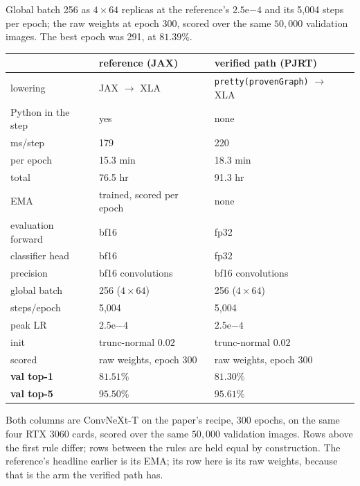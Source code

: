 \noindent Global batch 256 as $4 \times 64$ replicas at the reference's
$2.5\mathrm{e}{-4}$ and its 5{,}004 steps per epoch; the raw weights at
epoch 300, scored over the same $50{,}000$ validation images. The best
epoch was 291, at $81.39\%$.


\begin{center}
\begin{tabular}{@{}l l l@{}}
\hline
 & reference (JAX) & verified path (PJRT) \\
\hline
lowering             & JAX $\to$ XLA            & \texttt{pretty(provenGraph)} $\to$ XLA \\
Python in the step   & yes                      & none \\
ms/step              & 179                      & 220 \\
per epoch            & 15.3 min                 & 18.3 min \\
total                & 76.5 hr                  & 91.3 hr \\
EMA                  & trained, scored per epoch & none \\
evaluation forward   & bf16                     & fp32 \\
classifier head      & bf16                     & fp32 \\
\hline
precision            & bf16 convolutions        & bf16 convolutions \\
global batch         & 256 ($4\times64$)        & 256 ($4\times64$) \\
steps/epoch          & 5{,}004                  & 5{,}004 \\
peak LR              & $2.5\mathrm{e}{-4}$      & $2.5\mathrm{e}{-4}$ \\
init                 & trunc-normal $0.02$      & trunc-normal $0.02$ \\
scored               & raw weights, epoch 300   & raw weights, epoch 300 \\
\hline
\textbf{val top-1}   & $\mathbf{81.51\%}$       & $\mathbf{81.30\%}$ \\
\textbf{val top-5}   & $\mathbf{95.50\%}$       & $\mathbf{95.61\%}$ \\
\hline
\end{tabular}
\end{center}

\noindent Both columns are ConvNeXt-T on the paper's recipe, 300 epochs,
on the same four RTX 3060 cards, scored over the same $50{,}000$
validation images. Rows above the first rule differ; rows between the
rules are held equal by construction. The reference's headline earlier
is its EMA; its row here is its raw weights, because that is the arm the
verified path has.

